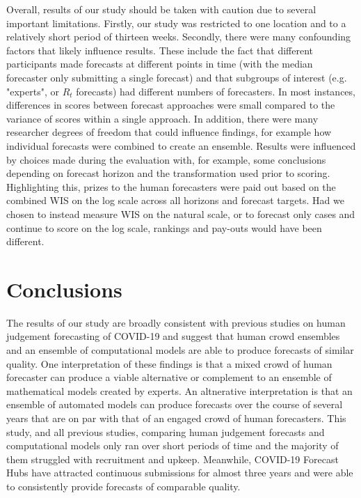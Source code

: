 \documentclass[10pt,a4paper,twocolumn]{article}
\begin{document}
Overall, results of our study should be taken with caution due to several important limitations. Firstly, our study was restricted to one location and to a relatively short period of thirteen weeks. Secondly, there were many confounding factors that likely influence results. These include the fact that different participants made forecasts at different points in time (with the median forecaster only submitting a single forecast) and that subgroups of interest (e.g. "experts", or $R_t$ forecasts) had different numbers of forecasters. 
In most instances, differences in scores between forecast approaches were small compared to the variance of scores within a single approach. In addition, there were many researcher degrees of freedom that could influence findings, for example how individual forecasts were combined to create an ensemble. Results were influenced by choices made during the evaluation with, for example, some conclusions  depending on forecast horizon and the transformation used prior to scoring. 
Highlighting this, prizes to the human forecasters were paid out based on the combined WIS on the log scale across all horizons and forecast targets. Had we chosen to instead measure WIS on the natural scale, or to forecast only cases and continue to score on the log scale, rankings and pay-outs would have been different. 


\section*{Conclusions}

The results of our study are broadly consistent with previous studies on human judgement forecasting of COVID-19 and suggest that human crowd ensembles and an ensemble of computational models are able to produce forecasts of similar quality. 
One interpretation of these findings is that a mixed crowd of human forecaster can produce a viable alternative or complement to an ensemble of mathematical models created by experts. An altnerative interpretation is that an ensemble of automated models can produce forecasts over the course of several years that are on par with that of an engaged crowd of human forecasters. This study, and all previous studies, comparing human judgement forecasts and computational models only ran over short periods of time and the majority of them struggled with recruitment and upkeep. Meanwhile, COVID-19 Forecast Hubs have attracted continuous submissions for almost three years and were able to consistently provide forecasts of comparable quality. 
\end{document}
